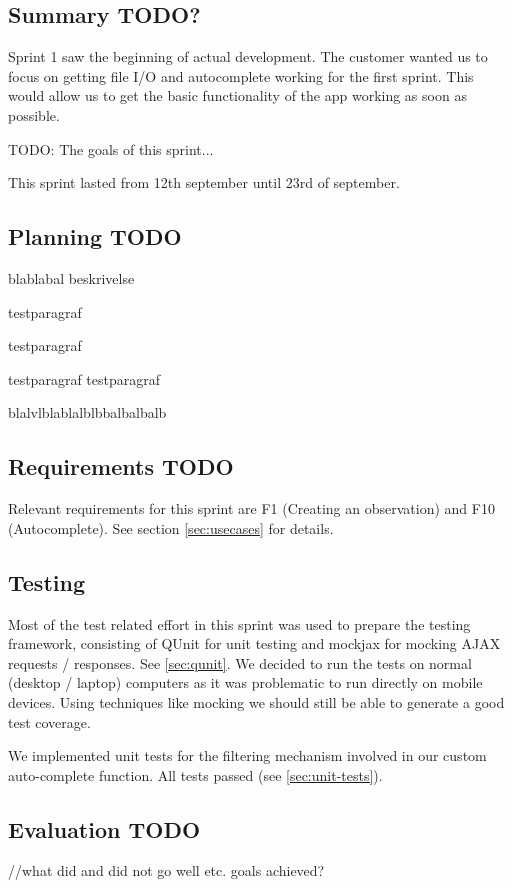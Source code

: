 \subsection{Summary TODO?}

	Sprint 1 saw the beginning of actual development. The customer wanted us to focus on getting file I/O and autocomplete working for the first sprint. This would allow us to get the basic functionality of the app working as soon as possible.
	
	TODO:
	The goals of this sprint...

	This sprint lasted from 12th september until 23rd of september.
 
\subsection{Planning TODO}
	blablabal beskrivelse

	testparagraf

	testparagraf

	testparagraf testparagraf

	blalvlblablalblbbalbalbalb


\subsection{Requirements TODO}

	Relevant requirements for this sprint are F1 (Creating an observation) and F10 (Autocomplete). See section \ref{sec:usecases} for details.


\subsection{Testing}

	Most of the test related effort in this sprint was used to prepare the
	testing framework, consisting of QUnit for unit testing and mockjax for
	mocking AJAX requests / responses. See \ref{sec:qunit}. We decided to run
	the tests on normal (desktop / laptop) computers as it was problematic to
	run directly on mobile devices. Using techniques like mocking we should
	still be able to generate a good test coverage.

	We implemented unit tests for the filtering mechanism involved in our custom
	auto-complete function. All tests passed (see \ref{sec:unit-tests}).

\subsection{Evaluation TODO}
	//what did and did not go well etc. goals achieved?
